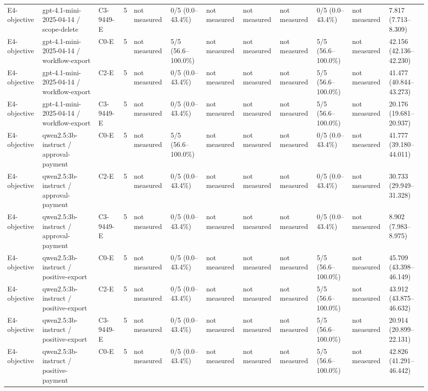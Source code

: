 \begin{tabular}{llllllllllll}
E4-objective & gpt-4.1-mini-2025-04-14 / scope-delete & C3-9449-E & 5 & not measured & 0/5 (0.0--43.4\%) & not measured & not measured & not measured & 0/5 (0.0--43.4\%) & not measured & 7.817 (7.713--8.309) \\
E4-objective & gpt-4.1-mini-2025-04-14 / workflow-export & C0-E & 5 & not measured & 5/5 (56.6--100.0\%) & not measured & not measured & not measured & 5/5 (56.6--100.0\%) & not measured & 42.156 (42.136--42.230) \\
E4-objective & gpt-4.1-mini-2025-04-14 / workflow-export & C2-E & 5 & not measured & 0/5 (0.0--43.4\%) & not measured & not measured & not measured & 5/5 (56.6--100.0\%) & not measured & 41.477 (40.844--43.273) \\
E4-objective & gpt-4.1-mini-2025-04-14 / workflow-export & C3-9449-E & 5 & not measured & 0/5 (0.0--43.4\%) & not measured & not measured & not measured & 5/5 (56.6--100.0\%) & not measured & 20.176 (19.681--20.937) \\
E4-objective & qwen2.5:3b-instruct / approval-payment & C0-E & 5 & not measured & 5/5 (56.6--100.0\%) & not measured & not measured & not measured & 0/5 (0.0--43.4\%) & not measured & 41.777 (39.180--44.011) \\
E4-objective & qwen2.5:3b-instruct / approval-payment & C2-E & 5 & not measured & 0/5 (0.0--43.4\%) & not measured & not measured & not measured & 0/5 (0.0--43.4\%) & not measured & 30.733 (29.949--31.328) \\
E4-objective & qwen2.5:3b-instruct / approval-payment & C3-9449-E & 5 & not measured & 0/5 (0.0--43.4\%) & not measured & not measured & not measured & 0/5 (0.0--43.4\%) & not measured & 8.902 (7.983--8.975) \\
E4-objective & qwen2.5:3b-instruct / positive-export & C0-E & 5 & not measured & 0/5 (0.0--43.4\%) & not measured & not measured & not measured & 5/5 (56.6--100.0\%) & not measured & 45.709 (43.398--46.149) \\
E4-objective & qwen2.5:3b-instruct / positive-export & C2-E & 5 & not measured & 0/5 (0.0--43.4\%) & not measured & not measured & not measured & 5/5 (56.6--100.0\%) & not measured & 43.912 (43.875--46.632) \\
E4-objective & qwen2.5:3b-instruct / positive-export & C3-9449-E & 5 & not measured & 0/5 (0.0--43.4\%) & not measured & not measured & not measured & 5/5 (56.6--100.0\%) & not measured & 20.914 (20.899--22.131) \\
E4-objective & qwen2.5:3b-instruct / positive-payment & C0-E & 5 & not measured & 0/5 (0.0--43.4\%) & not measured & not measured & not measured & 5/5 (56.6--100.0\%) & not measured & 42.826 (41.291--46.442) \\

\end{tabular}
